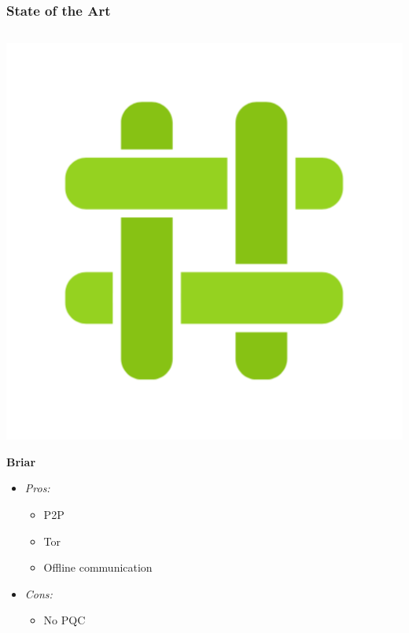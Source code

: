 \documentclass{beamer}
\begin{document}
\begin{frame}
    \frametitle{State of the Art}
    \begin{columns}[T,onlytextwidth]
    
    \begin{column}{0.5\textwidth}
        \begin{minipage}[c]{.15\textwidth}
            \includegraphics[width=\textwidth]{resources/briar.png}
        \end{minipage}%
        \begin{minipage}[c]{.85\textwidth}
            \textbf{  Briar}
        \end{minipage}
        
        \begin{itemize}
            \item[] \textit{Pros:}
            \begin{itemize}
				\item P2P
				\item Tor
                \item Offline communication
            \end{itemize}
            \item[] \textit{Cons:}
            \begin{itemize}
                \item No PQC
            \end{itemize}
        \end{itemize}
    \end{column}
    

\end{columns}
\end{frame}
\end{document}
